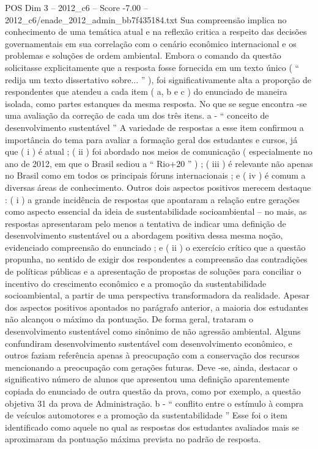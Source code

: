 \begin{textsample}{POS Dim 3 – 2012\_c6 – Score -7.00 – 2012\_c6/enade\_2012\_admin\_bb7f435184.txt}
Sua compreensão implica no conhecimento de uma temática atual e na reflexão critica a respeito das decisões governamentais em sua correlação com o cenário econômico internacional e os problemas e soluções de ordem ambiental.
Embora o comando da questão solicitasse explicitamente que a resposta fosse fornecida em um texto único ( “ redija um texto dissertativo sobre... ” ), foi significativamente alta a proporção de respondentes que atendeu a cada item ( a, b e c ) do enunciado de maneira isolada, como partes estanques da mesma resposta.
No que se segue encontra -se uma avaliação da correção de cada um dos três itens. a - “ conceito de desenvolvimento sustentável ” A variedade de respostas a esse item confirmou a importância do tema para avaliar a formação geral dos estudantes e cursos, já que ( i ) é atual ; ( ii ) foi abordado nos meios de comunicação ( especialmente no ano de 2012, em que o Brasil sediou a “ Rio+20 ” ) ; ( iii ) é relevante não apenas no Brasil como em todos os principais fóruns internacionais ; e ( iv ) é comum a diversas áreas de conhecimento.
Outros dois aspectos positivos merecem destaque : ( i ) a grande incidência de respostas que apontaram a relação entre gerações como aspecto essencial da ideia de sustentabilidade socioambiental – no mais, as respostas apresentaram pelo menos a tentativa de indicar uma definição de desenvolvimento sustentável ou a abordagem positiva dessa mesma noção, evidenciado compreensão do enunciado ; e ( ii ) o exercício crítico que a questão propunha, no sentido de exigir dos respondentes a compreensão das contradições de políticas públicas e a apresentação de propostas de soluções para conciliar o incentivo do crescimento econômico e a promoção da sustentabilidade socioambiental, a partir de uma perspectiva transformadora da realidade.
Apesar dos aspectos positivos apontados no parágrafo anterior, a maioria dos estudantes não alcançou o máximo da pontuação.
De forma geral, trataram o desenvolvimento sustentável como sinônimo de não agressão ambiental.
Alguns confundiram desenvolvimento sustentável com desenvolvimento econômico, e outros faziam referência apenas à preocupação com a conservação dos recursos mencionando a preocupação com gerações futuras.
Deve -se, ainda, destacar o significativo número de alunos que apresentou uma definição aparentemente copiada do enunciado de outra questão da prova, como por exemplo, a questão objetiva 31 da prova de Administração. b - “ conflito entre o estímulo à compra de veículos automotores e a promoção da sustentabilidade ” Esse foi o item identificado como aquele no qual as respostas dos estudantes avaliados mais se aproximaram da pontuação máxima prevista no padrão de resposta.

\end{textsample}
